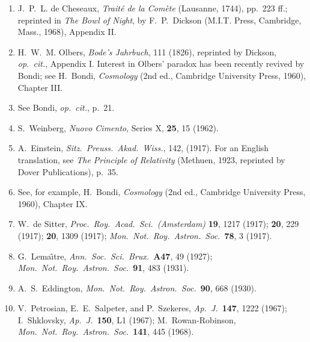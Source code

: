 \begin{enumerate}
  \item{}\label{ch16-ref-1}
  J.~P.~L. de Cheseaux, \emph{Trait\'e de la Com\`ete}
  (Lausanne, 1744), pp.~223 ff.; reprinted in \emph{The Bowl of Night},
  by F.~P.~Dickson (M.I.T. Press, Cambridge, Mass., 1968), Appendix II.

  \item{}\label{ch16-ref-2}
  H.~W.~M. Olbers, \emph{Bode's Jahrbuch}, 111 (1826), reprinted by
  Dickson, \emph{op.\ cit.}, Appendix I. Interest in Olbers' paradox has
  been recently revived by Bondi; see H.~Bondi, \emph{Cosmology}
  (2nd ed., Cambridge University Press, 1960), Chapter III.

  \item{}\label{ch16-ref-3}
  See Bondi, \emph{op.\ cit.}, p.~21.

  \item{}\label{ch16-ref-4}
  S.~Weinberg, \emph{Nuovo Cimento}, Series X, \textbf{25}, 15 (1962).

  \item{}\label{ch16-ref-5}
  A.~Einstein, \emph{Sitz.\ Preuss.\ Akad.\ Wiss.}, 142, (1917).
  For an English translation, see \emph{The Principle of Relativity}
  (Methuen, 1923, reprinted by Dover Publications), p.~35.

  \item{}\label{ch16-ref-6}
  See, for example, H.~Bondi, \emph{Cosmology}
  (2nd ed., Cambridge University Press, 1960), Chapter IX.

  \item{}\label{ch16-ref-7}
  W.~de Sitter, \emph{Proc.\ Roy.\ Acad.\ Sci.\ (Amsterdam)}
  \textbf{19}, 1217 (1917); \textbf{20}, 229 (1917);
  \textbf{20}, 1309 (1917);
  \emph{Mon.\ Not.\ Roy.\ Astron.\ Soc.}\ \textbf{78}, 3 (1917).

  \item{}\label{ch16-ref-8}
  G.~Lema\^{\i}tre, \emph{Ann.\ Soc.\ Sci.\ Brux.}\ \textbf{A47}, 49
  (1927); \emph{Mon.\ Not.\ Roy.\ Astron.\ Soc.}\ \textbf{91}, 483
  (1931).

  \item{}\label{ch16-ref-9}
  A.~S.~Eddington, \emph{Mon.\ Not.\ Roy.\ Astron.\ Soc.}\ \textbf{90},
  668 (1930).

  \item{}\label{ch16-ref-10}
  V.~Petrosian, E.~E.~Salpeter, and P.~Szekeres,
  \emph{Ap.\ J.}\ \textbf{147}, 1222 (1967);
  I.~Shklovsky, \emph{Ap.\ J.}\ \textbf{150}, L1 (1967);
  M.~Rowan-Robinson, \emph{Mon.\ Not.\ Roy.\ Astron.\ Soc.}\
  \textbf{141}, 445 (1968).


\end{enumerate}
